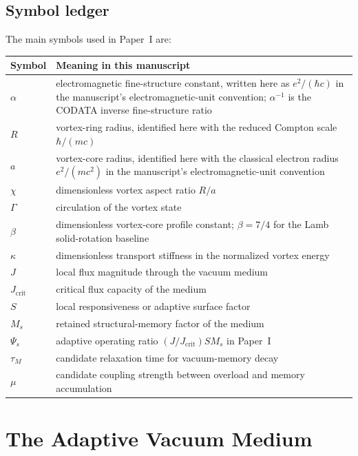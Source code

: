 \documentclass[11pt]{article}
\begin{document}
\subsection{Symbol ledger}

The main symbols used in Paper~I are:
\begin{center}
\small
\begin{tabular}{p{}p{}}
\toprule
\textbf{Symbol} & \textbf{Meaning in this manuscript}\\
\midrule
$\alpha$ & electromagnetic fine-structure constant, written here as $e^2/(\hbar c)$ in the manuscript's electromagnetic-unit convention; $\alpha^{-1}$ is the CODATA inverse fine-structure ratio\\
$R$ & vortex-ring radius, identified here with the reduced Compton scale $\hbar/(mc)$\\
$a$ & vortex-core radius, identified here with the classical electron radius $e^2/(mc^2)$ in the manuscript's electromagnetic-unit convention\\
$\chi$ & dimensionless vortex aspect ratio $R/a$\\
$\Gamma$ & circulation of the vortex state\\
$\beta$ & dimensionless vortex-core profile constant; $\beta=7/4$ for the Lamb solid-rotation baseline\\
$\kappa$ & dimensionless transport stiffness in the normalized vortex energy\\
$J$ & local flux magnitude through the vacuum medium\\
$J_\mathrm{crit}$ & critical flux capacity of the medium\\
$S$ & local responsiveness or adaptive surface factor\\
$M_s$ & retained structural-memory factor of the medium\\
$\Psi_s$ & adaptive operating ratio $(J/J_\mathrm{crit})SM_s$ in Paper~I\\
$\tau_M$ & candidate relaxation time for vacuum-memory decay\\
$\mu$ & candidate coupling strength between overload and memory accumulation\\
\bottomrule
\end{tabular}
\end{center}


\section{The Adaptive Vacuum Medium}
\end{document}
